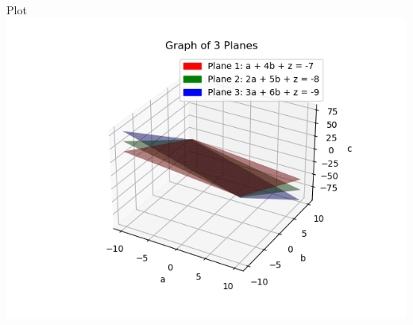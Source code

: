 \documentclass{beamer}
\begin{document}
\begin{frame}{Plot}
    \centering
    \includegraphics[width=\columnwidth, height=0.8\textheight, keepaspectratio]{Figure_13.png}     
\end{frame}
\end{document}
